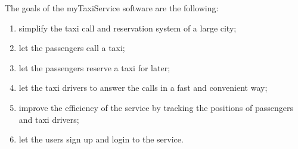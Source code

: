 The goals of the myTaxiService software are the following:
\begin{enumerate}
	\item simplify the taxi call and reservation system of a large city; \label{g-simplify}
	\item let the passengers call a taxi;  \label{g-taxicall}
	\item let the passengers reserve a taxi for later;  \label{g-reserve}
	\item let the taxi drivers to answer the calls in a fast and convenient way;  \label{g-notify}
	\item improve the efficiency of the service by tracking the positions of passengers and taxi drivers;  \label{g-position}
	\item let the users sign up and login to the service.  \label{g-login}
\end{enumerate}